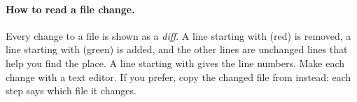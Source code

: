 \paragraph{How to read a file change.} Every change to a file is shown as a \emph{diff}. A line starting with \cmd{-} (red)
is removed, a line starting with \cmd{+} (green) is added, and the other lines are unchanged lines that help you find the
place. A line starting with  gives the line numbers. Make each change with a text editor. If you prefer, copy the
changed file from  instead: each step says which file it changes.
